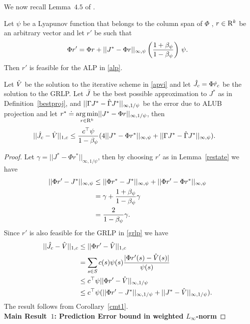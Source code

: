 We now recall Lemma~$4.5$ of \cite{ALP}. 
\begin{lemma}\label{restate}
Let $\psi$ be a Lyapunov function that belongs to the column span of $\Phi$ , $r \in \mathrm{R}^k$ be an arbitrary vector and let $r'$ be such that
\begin{align}
\Phi r'=\Phi r+||J^*-\Phi r||_{\infty,\psi} \left(\frac{1+\beta_{\psi}}{1-\beta_{\psi}}\right)\, \psi.
\end{align}
Then $r'$ is feasible for the ALP in \eqref{alp}. 
\end{lemma}
\begin{theorem}\label{mt2mn}
Let $\hat{V}$ be the solution to the iterative scheme in \eqref{apvi} and let $\hat{J}_c=\Phi \hat{r}_c$ be the solution to the GRLP. Let $\bar{J}$ be the best possible approximation to $J^*$ as in Definition~\ref{bestproj}, and $||\Gamma J^* -\hat{\Gamma} J^*||_{\infty,1/\psi}$ be the error due to ALUB projection and let $r^*\doteq\underset{r\in \mathrm{R}^k}{\arg\min}||J^*-\Phi r||_{\infty,1/\psi}$, then
\begin{align}
||\hat{J}_c-\hat{V}||_{1,c}&\leq \frac{c^\top \psi}{1-\beta_\psi}(4||J^*-\Phi r^*||_{\infty,\psi}
+||\Gamma J^*-\hat{\Gamma} J^*||_{\infty,\psi}).
\end{align}
\end{theorem}
\begin{proof}
Let $\gamma=||J^*-\Phi r^*||_{\infty,1/\psi}$, then by choosing $r'$ as in Lemma~\ref{restate} we have
\begin{align}
||\Phi r'-J^*||_{\infty,\psi}&\leq ||\Phi r^*-J^*||_{\infty,\psi}+||\Phi r'-\Phi r^*||_{\infty,\psi}\nonumber\\
&=\gamma+\frac{1+\beta_\psi}{1-\beta_\psi}\gamma\nonumber\\
&=\frac{2}{1-\beta_\psi}\gamma.\nonumber
\end{align}
Since $r'$ is also feasible for the GRLP in \eqref{grlp} we have
\begin{align}
||\hat{J}_c-\hat{V}||_{1,c}&\leq||\Phi r'-\hat{V}||_{1,c}\nonumber\\
&=\sum_{s\in S}c(s)\psi(s)\frac{|\Phi r'(s)-\hat{V}(s)|}{\psi(s)}\nonumber\\
&\leq c^\top \psi ||\Phi r'-\hat{V}||_{\infty,1/\psi}\nonumber\\
&\leq c^\top \psi (||\Phi r'-J^*||_{\infty,1/\psi}+||J^*-\hat{V}||_{\infty,1/\psi}).
\end{align}
The result follows from Corollary~\ref{cmt1}.\\
\textbf{Main Result~$1$: Prediction Error bound in weighted $L_\infty$-norm}
\end{proof}
